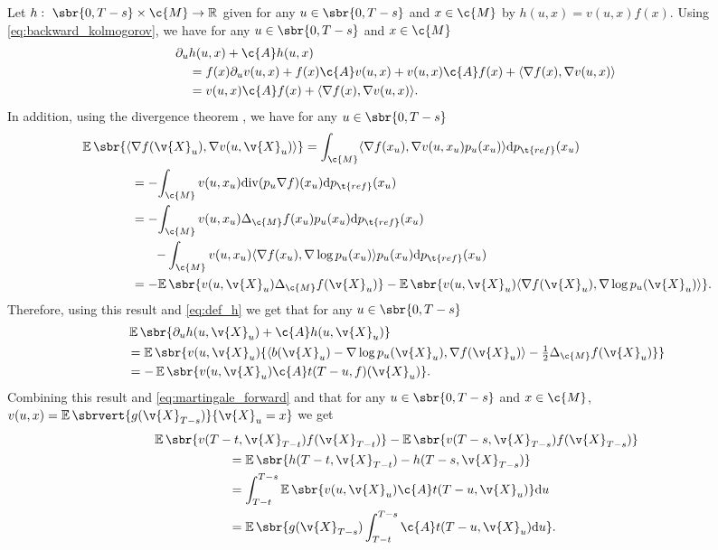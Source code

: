 Let \(h: \ \sbr{0,T-s} \times \c{M} \to \R\) given for any \(u \in \sbr{0,T-s}\) and \(x \in \c{M}\) by \(h(u,x) = v(u,x) f(x)\).
Using \eqref{eq:backward_kolmogorov}, we have for any \(u \in \sbr{0,T-s}\) and \(x \in \c{M}\) \begin{align} \partial_u& h(u,x) + \c{A} h(u, x)\\ & = f(x) \partial_u v(u,x) + f(x) \c{A} v(u,x) + v(u,x) \c{A} f(x) + \langle \nabla f(x), \nabla v(u,x)\rangle \\  & = v(u,x) \c{A} f(x) + \langle \nabla f(x), \nabla v(u,x)\rangle .
                 \label{eq:def_h}
\end{align}
In addition, using the divergence theorem \parencite[see][p.51]{lee2018introduction}, we have for any \(u \in \sbr{0,T-s}\) \begin{align}  & \E\sbr{\langle \nabla f(\v{X}_u), \nabla v(u,\v{X}_u)\rangle} = {\int_{\c{M}} \langle \nabla f(x_u), \nabla v(u,x_u) p_u(x_u) \rangle \mathrm{d} p_{\t{ref}}(x_u) } \\ & \qquad \qquad = - {\int_{\c{M}} v(u,x_u) \mathrm{div}(p_u \nabla f) (x_u) \mathrm{d} p_{\t{ref}}(x_u) } \\ & \qquad \qquad = - {\int_{\c{M}} v(u,x_u) \Delta_\c{M} f(x_u) p_u(x_u) \mathrm{d} p_{\t{ref}}(x_u)} \\ & \qquad \qquad \qquad {- \int_{\c{M}} v(u,x_u) \langle \nabla f(x_u), \nabla \log p_u(x_u) \rangle p_u(x_u) \mathrm{d} p_{\t{ref}}(x_u) } \\ & \qquad \qquad = - {\E\sbr{ v(u,\v{X}_u) \Delta_\c{M} f(\v{X}_u)} - \E\sbr{ v(u,\v{X}_u) \langle \nabla f(\v{X}_u), \nabla \log p_u(\v{X}_u) \rangle} } .
\end{align}
Therefore, using this result and \eqref{eq:def_h} we get that for any \(u \in \sbr{0,T-s}\) \begin{align}  & \E\sbr{\partial_u h(u,\v{X}_u) + \c{A} h(u, \v{X}_u)} \\ &= \E\sbr{v(u,\v{X}_u)\{ \langle b(\v{X}_u) - \nabla \log p_u(\v{X}_u), \nabla f(\v{X}_u) \rangle -\tfrac{1}{2} \Delta_\c{M} f(\v{X}_u)\}} \\ &= -\E\sbr{v(u,\v{X}_u)\c{A}t(T-u,f)(\v{X}_u)} .
\end{align}
Combining this result and \eqref{eq:martingale_forward} and that for any \(u \in \sbr{0,T-s}\) and \(x \in \c{M}\), \(v(u,x) = \E\sbrvert{g(\v{X}_{T-s})}{\v{X}_u=x}\) we get \begin{align}  & \E\sbr{v(T-t,\v{X}_{T-t})f(\v{X}_{T-t})} - \E\sbr{v(T-s,\v{X}_{T-s})f(\v{X}_{T-s})} \\ & \qquad \qquad \qquad = \E\sbr{h(T-t, \v{X}_{T-t}) - h(T-s, \v{X}_{T-s})} \\ & \qquad \qquad \qquad = {\int_{T-t}^{T-s} \E\sbr{v(u,\v{X}_u)\c{A}t(T-u, \v{X}_u)} \mathrm{d} u } \\  & \qquad \qquad \qquad= {\E\sbr{g(\v{X}_{T-s})\int_{T-t}^{T-s} \c{A}t(T-u, \v{X}_u) \mathrm{d} u } .
              }
\end{align}
